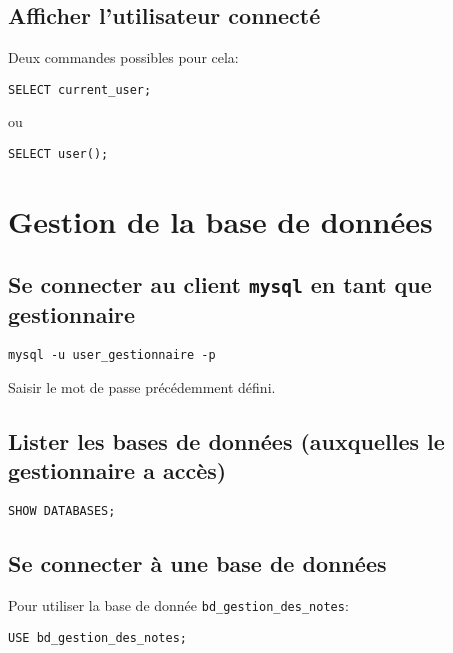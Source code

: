 \documentclass[11pt]{article}
\begin{document}
\subsection{Afficher l'utilisateur connecté}
\label{sec:orga7cf1ee}

Deux commandes possibles pour cela:
\begin{verbatim}
SELECT current_user;
\end{verbatim}

ou 

\begin{verbatim}
SELECT user();
\end{verbatim}


\section{Gestion de la base de données}
\label{sec:orge0bc5b4}

\subsection{Se connecter au client \texttt{mysql} en tant que gestionnaire}
\label{sec:orga97f64e}

\begin{verbatim}
mysql -u user_gestionnaire -p
\end{verbatim}

Saisir le mot de passe précédemment défini. 


\subsection{Lister les bases de données (auxquelles le gestionnaire a accès)}
\label{sec:org8bf36c1}

\begin{verbatim}
SHOW DATABASES;
\end{verbatim}

\subsection{Se connecter à une base de données}
\label{sec:org2ad4ae0}
Pour utiliser la base de donnée \texttt{bd\_gestion\_des\_notes}:

\begin{verbatim}
USE bd_gestion_des_notes;      
\end{verbatim}
\end{document}
